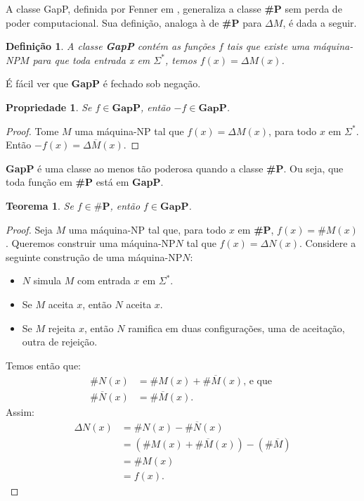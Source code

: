 \documentclass[paper=a4, fontsize=11pt]{scrartcl} %
\newtheorem{theorem}{Teorema}
\newtheorem{definition}{Definição}
\newtheorem{property}{Propriedade}
\numberwithin{equation}{subsection}
\numberwithin{figure}{subsection}
\numberwithin{table}{subsection}
\numberwithin{definition}{subsection}
\numberwithin{theorem}{subsection}
\numberwithin{property}{subsection}
\numberwithin{proposition}{subsection}
\newcommand{\words}{$\Sigma^*$\xspace}
\newcommand{\SP}{\textbf{\#P}\xspace}
\newcommand{\gP}{\textbf{GapP}\xspace}
\newcommand{\npmach}{máquina-NP\xspace}
\newcommand{\del}[1]{\Delta #1}
\renewcommand{\bar}[1]{\overline{#1}}
\begin{document}
A classe GapP, definida por Fenner em \cite{Fenner94}, generaliza a classe \SP sem perda de poder computacional. Sua definição, analoga à de \SP para $\Delta M$, é dada a seguir.

\begin{definition}
A classe \gP contém as funções $f$ tais que existe uma \npmach $M$ para que toda entrada x em \words, temos $f(x) = \Delta M(x)$.
\end{definition}

É fácil ver que \gP é fechado sob negação.

\begin{property}
Se $f \in \gP$, então $ -f \in \gP$. 
\end{property}
\begin{proof}
Tome $M$ uma \npmach tal que $f(x) = \Delta M(x)$, para todo $x$ em \words. Então $-f(x) = \Delta \bar{M}(x)$.
\end{proof}



\gP é uma classe ao menos tão poderosa quando a classe \SP. Ou seja, que toda função em \SP está em \gP.

\begin{theorem}
Se $f \in \SP$, então $f \in \gP$.
\end{theorem}
\begin{proof}
Seja $M$ uma \npmach tal que, para todo $x$ em \SP, $f(x) = \#M(x)$. Queremos construir uma \npmach $N$ tal que $f(x) = \del{N(x)}$. Considere a seguinte construção de uma \npmach $N$:
\begin{itemize}
	\item $N$ simula $M$ com entrada $x$ em \words.
	\item Se $M$ aceita $x$, então $N$ aceita $x$.
	\item Se $M$ rejeita $x$, então $N$ ramifica em duas configurações, uma de aceitação, outra de rejeição.
\end{itemize}

Temos então que:
\begin{align*}
\#N(x) 	     &= \#M(x) + \#\bar{M}(x) \text{, e que } \\
\#\bar{N}(x) &= \#\bar{M}(x).
\end{align*} 
Assim:
\begin{align*}
\del{N(x)}  &= \#N(x) - \#\bar{N}(x) \\
		 	&= (\#M(x) + \#\bar{M}(x)) - (\#\bar{M}) \\
		 	&= \#M(x) \\
		 	&= f(x).
\end{align*}
\end{proof}
\end{document}
